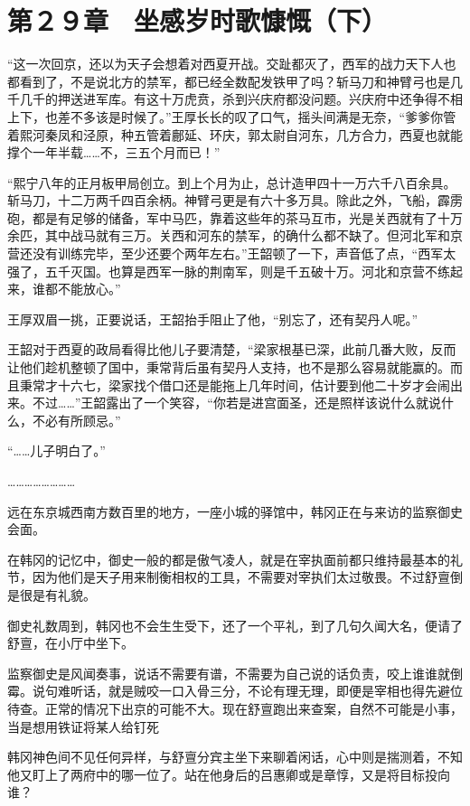 \section{第２９章　坐感岁时歌慷慨（下）}

“这一次回京，还以为天子会想着对西夏开战。交趾都灭了，西军的战力天下人也都看到了，不是说北方的禁军，都已经全数配发铁甲了吗？斩马刀和神臂弓也是几千几千的押送进军库。有这十万虎贲，杀到兴庆府都没问题。兴庆府中还争得不相上下，也差不多该是时候了。”王厚长长的叹了口气，摇头间满是无奈，“爹爹你管着熙河秦凤和泾原，种五管着鄜延、环庆，郭太尉自河东，几方合力，西夏也就能撑个一年半载……不，三五个月而已！”

“熙宁八年的正月板甲局创立。到上个月为止，总计造甲四十一万六千八百余具。斩马刀，十二万两千四百余柄。神臂弓更是有六十多万具。除此之外，飞船，霹雳砲，都是有足够的储备，军中马匹，靠着这些年的茶马互市，光是关西就有了十万余匹，其中战马就有三万。关西和河东的禁军，的确什么都不缺了。但河北军和京营还没有训练完毕，至少还要个两年左右。”王韶顿了一下，声音低了点，“西军太强了，五千灭国。也算是西军一脉的荆南军，则是千五破十万。河北和京营不练起来，谁都不能放心。”

王厚双眉一挑，正要说话，王韶抬手阻止了他，“别忘了，还有契丹人呢。”

王韶对于西夏的政局看得比他儿子要清楚，“梁家根基已深，此前几番大败，反而让他们趁机整顿了国中，秉常背后虽有契丹人支持，也不是那么容易就能赢的。而且秉常才十六七，梁家找个借口还是能拖上几年时间，估计要到他二十岁才会闹出来。不过……”王韶露出了一个笑容，“你若是进宫面圣，还是照样该说什么就说什么，不必有所顾忌。”

“……儿子明白了。”

……………………

远在东京城西南方数百里的地方，一座小城的驿馆中，韩冈正在与来访的监察御史会面。

在韩冈的记忆中，御史一般的都是傲气凌人，就是在宰执面前都只维持最基本的礼节，因为他们是天子用来制衡相权的工具，不需要对宰执们太过敬畏。不过舒亶倒是很是有礼貌。

御史礼数周到，韩冈也不会生生受下，还了一个平礼，到了几句久闻大名，便请了舒亶，在小厅中坐下。

监察御史是风闻奏事，说话不需要有谱，不需要为自己说的话负责，咬上谁谁就倒霉。说句难听话，就是贼咬一口入骨三分，不论有理无理，即便是宰相也得先避位待查。正常的情况下出京的可能不大。现在舒亶跑出来查案，自然不可能是小事，当是想用铁证将某人给钉死

韩冈神色间不见任何异样，与舒亶分宾主坐下来聊着闲话，心中则是揣测着，不知他又盯上了两府中的哪一位了。站在他身后的吕惠卿或是章惇，又是将目标投向谁？

